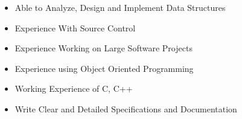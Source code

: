
\begin{itemize}
\item Able to Analyze, Design and Implement Data Structures
\item Experience With Source Control
\item Experience Working on Large Software Projects
\item Experience using Object Oriented Programming
\item Working Experience of C, C++
\item Write Clear and Detailed Specifications and Documentation
\end{itemize}




